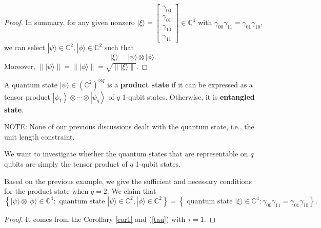 \begin{example}
\begin{proof}
    In summary, for any given nonzero $|\xi\rangle=\left[\begin{array}{c}\gamma_{00} \\ \gamma_{01} \\ \gamma_{10} \\ \gamma_{11}\end{array}\right] \in \mathbb{C}^4 $ with $ \gamma_{00} \gamma_{11}=\gamma_{01} \gamma_{10}$, we can select $|\psi\rangle \in \mathbb{C}^2,|\phi\rangle \in \mathbb{C}^2$ such that
    \begin{equation}
        |\xi\rangle=|\psi\rangle \otimes|\phi\rangle.
    \end{equation}
    Moreover, $\||\psi\rangle\|=\||\phi\rangle \|=\sqrt{\||\xi\rangle \|}$.
    
    \end{proof}
\end{example}

\begin{definition}
  A quantum state $|\psi\rangle \in\left(\mathbb{C}^2\right)^{\otimes q}$ is a \textbf{product state} if it can be expressed as a tensor product $\left|\psi_1\right\rangle \otimes \cdots \otimes\left|\psi_q\right\rangle$ of $q$ 1-qubit states. Otherwise, it is \textbf{entangled state}.
\end{definition}

NOTE: None of our previous discussions dealt with the quantum state, i.e., the unit length constraint.

We want to investigate whether the quantum states that are representable on $q$ qubits are simply the tensor product of $q$ 1-qubit states.

\begin{example}
        Based on the previous example,
        we give the sufficient and necessary conditions for the product state when $q = 2$. We claim that
        $$\left\{|\psi\rangle \otimes|\phi\rangle \in \mathbb{C}^4:
        \text{ quantum state } |\psi\rangle \in \mathbb{C}^2,
        |\phi\rangle \in \mathbb{C}^2
        \right\} 
        =\left\{\text{ quantum state } |\xi\rangle \in \mathbb{\mathbb { C }}^{4}: \gamma_{00} \gamma_{11}=\gamma_{01} \gamma_{10}\right\}.
        $$
        \begin{proof}
            It comes from the Corollary \ref{cor1} and (\ref{tau}) with $\tau=1$.
        \end{proof} 
\end{example}


